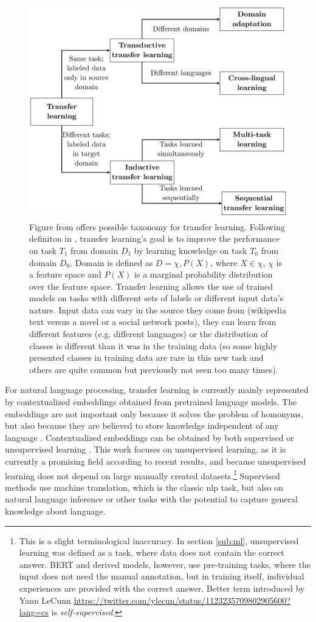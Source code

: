 \begin{figure}[H]
\centering
\includegraphics[width=0.7\columnwidth]{../img/tl_taxonomy}
\caption[Possible taxonomy for a transfer learning]{Figure from \protect\citep{Ruder2019} offers possible taxonomy for transfer learning. %
Following definiton in \citep{Pan2009}, transfer learning's goal is to improve the performance on task $T_1$ from domain $D_1$ by learning knowledge on task $T_0$ from domain $D_0$. Domain is defined as $D = {\chi,P(X)}$, where $X \in \chi$, $\chi$ is a feature space and $P(X)$ is a marginal probability distribution over the feature space. Transfer learning allows the use of trained models on tasks with different sets of labels or different input data's nature. Input data can vary in the source they come from (wikipedia text versus a novel or a social network posts), they can learn from different features (e.g. different languages) or the distribution of classes is different than it was in the training data (so some highly presented classes in training data are rare in this new task and others are quite common but previously not seen too many times).
}
\label{pic:tl_taxonomy}
\end{figure}
For natural language processing, transfer learning is currently mainly represented by contextualized embeddings obtained from pretrained language models.
The embeddings are not important only because it solves the problem of homonyms, but also because they are believed to store knowledge independent of any language \citep{Feijo2020, Hewitt2020}. Contextualized embeddings can be obtained by both supervised or unsupervised learning \citep{Liu2020}. This work focuses on unsupervised learning, as it is currently a promising field according to recent results, and because unsupervised learning does not depend on large manually created datasets.\footnote{This is a slight terminological inaccuracy. In section \ref{sub:ml}, unsupervised learning was defined as a task, where data does not contain the correct answer. BERT and derived models, however, use pre-training tasks, where the input does not need the manual annotation, but in training itself, individual experiences are provided with the correct answer. Better term introduced by Yann LeCunn \url{https://twitter.com/ylecun/status/1123235709802905600?lang=cs} is \textit{self-supervised}.} Supervised methods use machine translation, which is the classic \acrshort{nlp} task, but also on natural language inference or other tasks with the potential to capture general knowledge about language.

